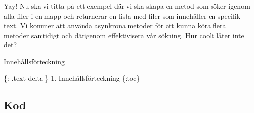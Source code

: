 Yay! Nu ska vi titta på ett exempel där vi ska skapa en metod som söker
igenom alla filer i en mapp och returnerar en lista med filer som
innehåller en specifik text. Vi kommer att använda asynkrona metoder för
att kunna köra flera metoder samtidigt och därigenom effektivisera vår
sökning. Hur coolt låter inte det?

Innehållsförteckning

\{: .text-delta \} 1. Innehållsförteckning \{:toc\}

\hypertarget{kod}{%
\subsection{Kod}\label{kod}}

\hypertarget{cb1}{}
\begin{Shaded}
\begin{Highlighting}[]
 \OperatorTok{;}
 \OperatorTok{;}
 \OperatorTok{;}
 \OperatorTok{;}
 \OperatorTok{;}
 \OperatorTok{;}
 \OperatorTok{;}
 \OperatorTok{;}
 \OperatorTok{;}
 \OperatorTok{;}

 \OperatorTok{\{}
       \OperatorTok{(}\OperatorTok{[]}\OperatorTok{)}   \OperatorTok{\{}
\OperatorTok{=}  \OperatorTok{();}


\end{Highlighting}
\end{Shaded}
